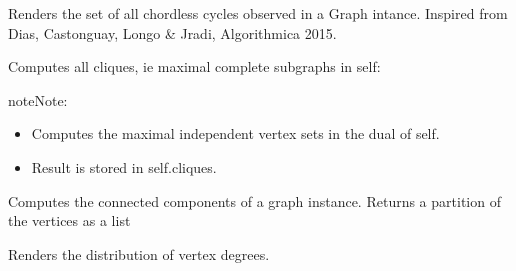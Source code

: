 \documentclass[letterpaper,10pt,english]{sphinxmanual}
\begin{document}
\begin{fulllineitems}
\begin{description}
\end{description}

\begin{fulllineitems}
\label{techDoc:graphs.Graph.computeChordlessCycles}
Renders the set of all chordless cycles observed in a Graph
intance. Inspired from Dias, Castonguay, Longo \& Jradi,
Algorithmica 2015.

\end{fulllineitems}


\begin{fulllineitems}
\label{techDoc:graphs.Graph.computeCliques}
Computes all cliques, ie maximal complete subgraphs in self:

\begin{notice}{note}{Note:}\begin{itemize}
\item {} 
Computes the maximal independent vertex sets in the dual of self.

\item {} 
Result is stored in self.cliques.

\end{itemize}
\end{notice}

\end{fulllineitems}


\begin{fulllineitems}
\label{techDoc:graphs.Graph.computeComponents}
Computes the connected components of a graph instance.
Returns a partition of the vertices as a list

\end{fulllineitems}


\begin{fulllineitems}
\label{techDoc:graphs.Graph.computeDegreeDistribution}
Renders the distribution of vertex degrees.


\end{fulllineitems}
\end{fulllineitems}
\end{document}
